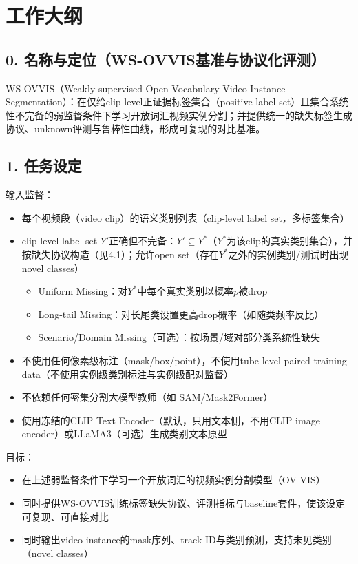 \documentclass[UTF8]{ctexart}
\begin{document}
\section*{工作大纲}


\subsection*{0. 名称与定位（WS-OVVIS基准与协议化评测）}
WS-OVVIS（Weakly-supervised Open-Vocabulary Video Instance Segmentation）：在仅给clip-level正证据标签集合（positive label set）且集合系统性不完备的弱监督条件下学习开放词汇视频实例分割；并提供统一的缺失标签生成协议、unknown评测与鲁棒性曲线，形成可复现的对比基准。


\par\noindent\hrulefill\par


\subsection*{1. 任务设定}
输入监督：
\begin{itemize}
\item 每个视频段（video clip）的语义类别列表（clip-level label set，多标签集合）
\item clip-level label set $Y'$正确但不完备：$Y'\subseteq Y^*$（$Y^*$为该clip的真实类别集合），并按缺失协议构造（见4.1）；允许open set（存在$Y^*$之外的实例类别/测试时出现novel classes）
\begin{itemize}
\item Uniform Missing：对$Y^*$中每个真实类别以概率$p$被drop
\item Long-tail Missing：对长尾类设置更高drop概率（如随类频率反比）
\item Scenario/Domain Missing（可选）：按场景/域对部分类系统性缺失
\end{itemize}
\item 不使用任何像素级标注（mask/box/point），不使用tube-level paired training data（不使用实例级类别标注与实例级配对监督）
\item 不依赖任何密集分割大模型教师（如 SAM/Mask2Former）
\item 使用冻结的CLIP Text Encoder（默认，只用文本侧，不用CLIP image encoder）或LLaMA3（可选）生成类别文本原型
\end{itemize}
目标：
\begin{itemize}
\item 在上述弱监督条件下学习一个开放词汇的视频实例分割模型（OV-VIS）
\item 同时提供WS-OVVIS训练标签缺失协议、评测指标与baseline套件，使该设定可复现、可直接对比
\item 同时输出video instance的mask序列、track ID与类别预测，支持未见类别（novel classes）
\end{itemize}
\end{document}
